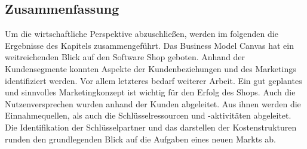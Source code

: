 %
%
%
%
%
\subsection{Zusammenfassung}
Um die wirtschaftliche Perspektive abzuschließen, werden im folgenden die Ergebnisse des Kapitels zusammengeführt. Das Business Model Canvas hat ein weitreichenden Blick auf den Software Shop geboten. Anhand der Kundensegmente konnten Aspekte der Kundenbeziehungen und des Marketings identifiziert werden. Vor allem letzteres bedarf weiterer Arbeit. Ein gut geplantes und sinnvolles Marketingkonzept ist wichtig für den Erfolg des Shops. Auch die Nutzenversprechen wurden anhand der Kunden abgeleitet. Aus ihnen werden die Einnahmequellen, als auch die Schlüsselressourcen und -aktivitäten abgeleitet. Die Identifikation der Schlüsselpartner und das darstellen der Kostenstrukturen runden den grundlegenden Blick auf die Aufgaben eines neuen Markts ab.\\

